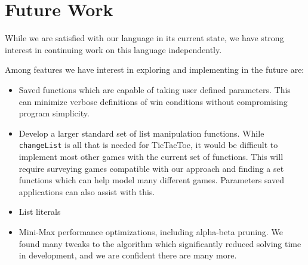 \documentclass{article}
\begin{document}
\section{Future Work}
While we are satisfied with our language in its current state, we have strong interest in continuing work on this language independently. 

Among features we have interest in exploring and implementing in the future are:
\begin{itemize}
\item Saved functions which are capable of taking user defined parameters. This can minimize verbose definitions of win conditions without compromising program simplicity.
\item Develop a larger standard set of list manipulation functions. While \verb|changeList| is all that is needed for TicTacToe, it would be difficult to implement most other games with the current set of functions. This will require surveying games compatible with our approach and finding a set functions which can help model many different games. Parameters saved applications can also assist with this.
\item List literals
\item Mini-Max performance optimizations, including alpha-beta pruning. We found many tweaks to the algorithm which  significantly reduced solving time in development, and we are confident there are many more.
\end{itemize}
\end{document}
